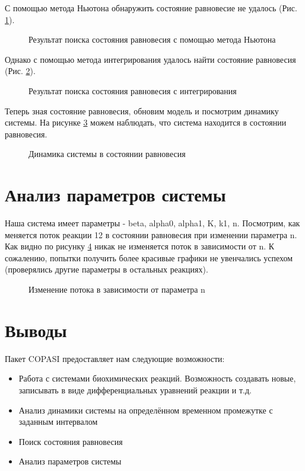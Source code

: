 С помощью метода Ньютона обнаружить состояние равновесие не удалось (Рис. \ref{ris:newton}).

\begin{figure}[!h]
\caption{Результат поиска состояния равновесия с помощью метода Ньютона}
\label{ris:newton}
\end{figure}

Однако с помощью метода интегрирования удалось найти состояние равновесия (Рис. \ref{ris:int}).

\begin{figure}[!h]
\caption{Результат поиска состояния равновесия с интегрирования}
\label{ris:int}
\end{figure}

Теперь зная состояние равновесия, обновим модель и посмотрим динамику системы.
На рисунке \ref{ris:steady} можем наблюдать, что система находится в состоянии равновесия.

\begin{figure}[!h]
\caption{Динамика системы в состоянии равновесия}
\label{ris:steady}
\end{figure}

\section{Анализ параметров системы}
Наша система имеет параметры - beta, alpha0, alpha1, K, k1, n. Посмотрим, как меняется поток реакции 12 в состоянии равновесия
при изменении параметра n. Как видно по рисунку \ref{ris:scan} никак не изменяется поток в зависимости от n.
К сожалению, попытки получить более красивые графики не увенчались успехом (проверялись другие параметры в остальных реакциях).

\begin{figure}[!h]
\caption{Изменение потока в зависимости от параметра n}
\label{ris:scan}
\end{figure}

\section{Выводы}
Пакет COPASI предоставляет нам следующие возможности:
\begin{itemize}
  \item Работа с системами биохимических реакций. Возможность создавать новые, записывать в виде дифференциальных уравнений реакции и т.д.
  \item Анализ динамики системы на определённом временном промежутке с заданным интервалом
  \item Поиск состояния равновесия
  \item Анализ параметров системы
\end{itemize}
